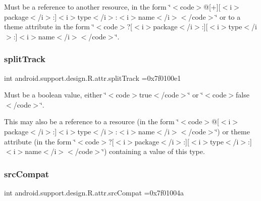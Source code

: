 Must be a reference to another resource, in the form \char`\"{}$<$code$>$@\mbox{[}+\mbox{]}\mbox{[}$<$i$>$package$<$/i$>$\+:\mbox{]}$<$i$>$type$<$/i$>$\+:$<$i$>$name$<$/i$>$$<$/code$>$\char`\"{} or to a theme attribute in the form \char`\"{}$<$code$>$?\mbox{[}$<$i$>$package$<$/i$>$\+:\mbox{]}\mbox{[}$<$i$>$type$<$/i$>$\+:\mbox{]}$<$i$>$name$<$/i$>$$<$/code$>$\char`\"{}. \mbox{\label{classandroid_1_1support_1_1design_1_1R_1_1attr_af1afe003beae279b9c25c54488687c06}} 
\subsubsection{\texorpdfstring{split\+Track}{splitTrack}}
{\footnotesize\ttfamily int android.\+support.\+design.\+R.\+attr.\+split\+Track =0x7f0100e1\hspace{0.3cm}{\ttfamily [static]}}

Must be a boolean value, either \char`\"{}$<$code$>$true$<$/code$>$\char`\"{} or \char`\"{}$<$code$>$false$<$/code$>$\char`\"{}. 

This may also be a reference to a resource (in the form \char`\"{}$<$code$>$@\mbox{[}$<$i$>$package$<$/i$>$\+:\mbox{]}$<$i$>$type$<$/i$>$\+:$<$i$>$name$<$/i$>$$<$/code$>$\char`\"{}) or theme attribute (in the form \char`\"{}$<$code$>$?\mbox{[}$<$i$>$package$<$/i$>$\+:\mbox{]}\mbox{[}$<$i$>$type$<$/i$>$\+:\mbox{]}$<$i$>$name$<$/i$>$$<$/code$>$\char`\"{}) containing a value of this type. \mbox{\label{classandroid_1_1support_1_1design_1_1R_1_1attr_aec1af09f1f86e1448a52a89a90842d29}} 
\subsubsection{\texorpdfstring{src\+Compat}{srcCompat}}
{\footnotesize\ttfamily int android.\+support.\+design.\+R.\+attr.\+src\+Compat =0x7f01004a\hspace{0.3cm}{\ttfamily [static]}}

